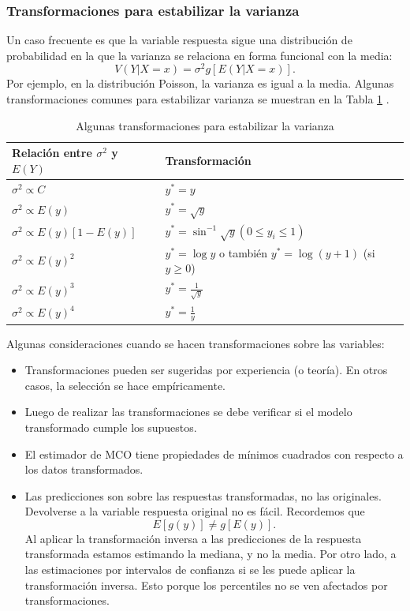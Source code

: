 \documentclass[
]{article}
\providecommand{\tightlist}{%
  \setlength{\itemsep}{0pt}\setlength{\parskip}{0pt}}
\begin{document}
\hypertarget{transformaciones-para-estabilizar-la-varianza}{%
\subsubsection{Transformaciones para estabilizar la varianza}\label{transformaciones-para-estabilizar-la-varianza}}

Un caso frecuente es que la variable respuesta sigue una distribución de probabilidad en la que la varianza se relaciona en forma funcional con la media:
\[
V(Y|X=x) = \sigma^2 g[E(Y|X=x)].
\]
Por ejemplo, en la distribución Poisson, la varianza es igual a la media. Algunas transformaciones comunes para estabilizar varianza se muestran en la Tabla \ref{tab:funcionesVar} \citep{behar_validacion_2002}.

\begin{table}

\caption{\label{tab:funcionesVar}Algunas transformaciones para estabilizar la varianza}
\centering
\begin{tabular}[t]{ll}
\toprule
Relación entre $\sigma^{2}$ y $E(Y)$ & Transformación\\
\midrule
$\sigma^{2} \propto C$ & $y^{*}=y$\\
$\sigma^{2} \propto E(y)$ & $y^{*}=\sqrt{y}$\\
$\sigma^{2} \propto E(y)[1-E(y)]$ & $y^{*}=\sin^{-1}\sqrt{y} (0 \leq y_{i} \leq 1)$\\
$\sigma^{2} \propto E(y)^{2}$ & $y^{*}=\log y$  o también  $y^{*}=\log (y+1)$ (si $y \geq 0$)\\
$\sigma^{2} \propto E(y)^{3}$ & $y^{*}=\frac{1}{\sqrt{y}}$\\
\addlinespace
$\sigma^{2} \propto E(y)^{4}$ & $y^{*}=\frac{1}{y}$\\
\bottomrule
\end{tabular}
\end{table}

Algunas consideraciones cuando se hacen transformaciones sobre las variables:

\begin{itemize}
\tightlist
\item
  Transformaciones pueden ser sugeridas por experiencia (o teoría).
  En otros casos, la selección se hace empíricamente.
\item
  Luego de realizar las transformaciones se debe verificar si el modelo transformado cumple los supuestos.
\item
  El estimador de MCO tiene propiedades de mínimos cuadrados con
  respecto a los datos transformados.
\item
  Las predicciones son sobre las respuestas transformadas, no las
  originales. Devolverse a la variable respuesta original no es fácil. Recordemos que
  \[
  E[g(y)] \neq g[E(y)].
  \]
  Al aplicar la transformación inversa a las predicciones de la respuesta transformada estamos estimando la mediana, y no la media. Por otro lado, a las estimaciones por intervalos de confianza si se les puede aplicar la transformación inversa. Esto porque los percentiles no se ven afectados por transformaciones.
\end{itemize}
\end{document}
